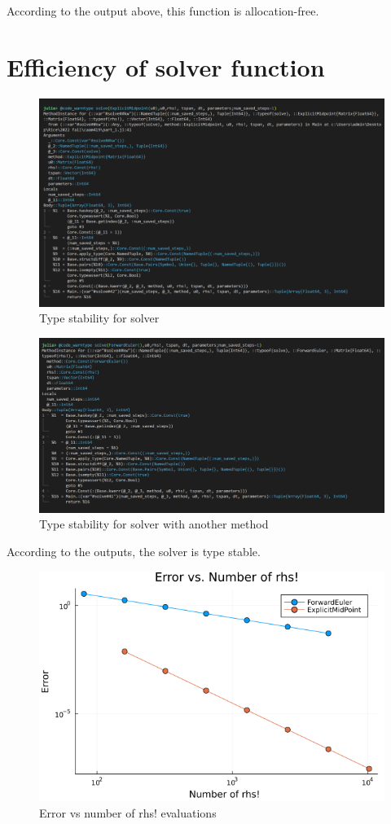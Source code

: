 \documentclass[10pt,a4paper]{article}
\begin{document}
\noindent According to the output above, this function is allocation-free.

\section{Efficiency of solver function}

\begin{figure}[!ht]
        \centering \includegraphics[scale=0.5]{figures/stability_solver1.png}
        \caption{Type stability for solver}
\end{figure}

\begin{figure}[!ht]
        \centering \includegraphics[scale=0.5]{figures/stability_solver2.png}
        \caption{Type stability for solver with another method}
\end{figure}

According to the outputs, the solver is type stable. 

\begin{figure}[!ht]
        \centering \includegraphics[scale=0.5]{figures/errorvsrhs.png}
        \caption{Error vs number of rhs! evaluations}
\end{figure}
\end{document}

